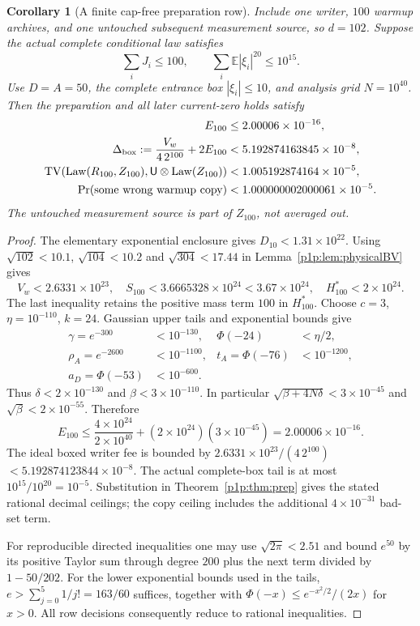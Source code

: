 \documentclass[11pt]{article}
\numberwithin{equation}{section}
\newtheorem{corollary}[theorem]{Corollary}
\theoremstyle{definition}
\theoremstyle{remark}
\begin{document}
\begin{corollary}[A finite cap-free preparation row]\label{p1p:cor:row}
Include one writer, $100$ warmup archives, and one untouched subsequent
measurement source, so $d=102$. Suppose the actual complete conditional
law satisfies
\[
 \sum_iJ_i\leq100,\qquad \sum_i\mathbb E|\xi_i|^{20}\leq10^{15}.
\]
Use $D=A=50$, the complete entrance box $|\xi_i|\leq10$, and analysis
grid $N=10^{40}$. Then the preparation and all later current-zero holds
satisfy
\begin{align}
 E_{100}&\leq2.00006\times10^{-16},\label{p1p:eq:rowE}\\
 \Delta_{\rm box}:=\frac{V_w}{4\,2^{100}}+2E_{100}
 &<5.192874163845\times10^{-8},\label{p1p:eq:rowbox}\\
 \operatorname{TV}(\operatorname{Law}(R_{100},Z_{100}),\mathsf U\otimes\operatorname{Law}(Z_{100}))
 &<1.005192874164\times10^{-5},\label{p1p:eq:rowfresh}\\
 \Pr(\hbox{some wrong warmup copy})
 &<1.000000002000061\times10^{-5}.\label{p1p:eq:rowcopy}
\end{align}
The untouched measurement source is part of $Z_{100}$, not averaged out.
\end{corollary}
\begin{proof}
The elementary exponential enclosure gives $D_{10}<1.31\times10^{22}$.
Using $\sqrt{102}<10.1$, $\sqrt{104}<10.2$ and $\sqrt{304}<17.44$ in
Lemma~\ref{p1p:lem:physicalBV} gives
\[
 V_w<2.6331\times10^{23},\quad
 S_{100}<3.6665328\times10^{24}<3.67\times10^{24},\quad
 H_{100}^*<2\times10^{24}.
\]
The last inequality retains the positive mass term $100$ in $H_{100}^*$.
Choose $c=3$, $\eta=10^{-110}$, $k=24$. Gaussian upper tails and
exponential bounds give
\begin{align*}
 \gamma=e^{-300}&<10^{-130},&
 \Phi(-24)&<\eta/2,\\
 \rho_A=e^{-2600}&<10^{-1100},&
 t_A=\Phi(-76)&<10^{-1200},\\
 a_D=\Phi(-53)&<10^{-600}.&&
\end{align*}
Thus $\delta<2\times10^{-130}$ and
$\beta<3\times10^{-110}$. In particular
$\sqrt{\beta+4N\delta}<3\times10^{-45}$ and
$\sqrt\beta<2\times10^{-55}$. Therefore
\[
 E_{100}\leq\frac{4\times10^{24}}{2\times10^{40}}
       +(2\times10^{24})(3\times10^{-45})
       =2.00006\times10^{-16}.
\]
The ideal boxed writer fee is bounded by
$2.6331\times10^{23}/(4\,2^{100})$
$<5.192874123844\times10^{-8}$.
The actual complete-box tail is at most $10^{15}/10^{20}=10^{-5}$.
Substitution in Theorem~\ref{p1p:thm:prep} gives the stated rational
decimal ceilings; the copy ceiling includes the additional
$4\times10^{-31}$ bad-set term.

For reproducible directed inequalities one may use
$\sqrt{2\pi}<2.51$ and bound $e^{50}$ by its positive Taylor sum through
degree $200$ plus the next term divided by $1-50/202$.
For the lower exponential bounds used in the tails,
$e>\sum_{j=0}^5 1/j!=163/60$ suffices, together with
$\Phi(-x)\leq e^{-x^2/2}/(2x)$ for $x>0$.
All row decisions consequently reduce to rational inequalities.
\end{proof}
\end{document}
